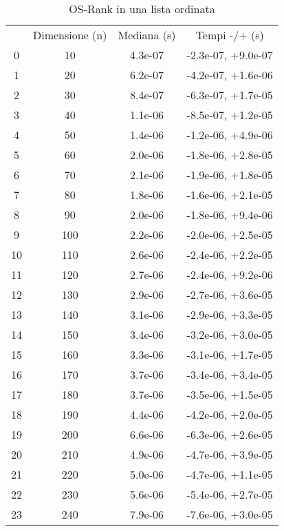 \begin{table}
\centering
\caption{OS-Rank in una lista ordinata}
\label{OS-Rank in una lista ordinata}
\begin{adjustbox}{width=1\textwidth/2}
\begin{tabular}{|c|c|c|c|}
\hline
 & Dimensione (n) & Mediana (s) & Tempi -/+ (s) \\
0 & 10 & 4.3e-07 & -2.3e-07, +9.0e-07 \\
\cline{1-4}
1 & 20 & 6.2e-07 & -4.2e-07, +1.6e-06 \\
\cline{1-4}
2 & 30 & 8.4e-07 & -6.3e-07, +1.7e-05 \\
\cline{1-4}
3 & 40 & 1.1e-06 & -8.5e-07, +1.2e-05 \\
\cline{1-4}
4 & 50 & 1.4e-06 & -1.2e-06, +4.9e-06 \\
\cline{1-4}
5 & 60 & 2.0e-06 & -1.8e-06, +2.8e-05 \\
\cline{1-4}
6 & 70 & 2.1e-06 & -1.9e-06, +1.8e-05 \\
\cline{1-4}
7 & 80 & 1.8e-06 & -1.6e-06, +2.1e-05 \\
\cline{1-4}
8 & 90 & 2.0e-06 & -1.8e-06, +9.4e-06 \\
\cline{1-4}
9 & 100 & 2.2e-06 & -2.0e-06, +2.5e-05 \\
\cline{1-4}
10 & 110 & 2.6e-06 & -2.4e-06, +2.2e-05 \\
\cline{1-4}
11 & 120 & 2.7e-06 & -2.4e-06, +9.2e-06 \\
\cline{1-4}
12 & 130 & 2.9e-06 & -2.7e-06, +3.6e-05 \\
\cline{1-4}
13 & 140 & 3.1e-06 & -2.9e-06, +3.3e-05 \\
\cline{1-4}
14 & 150 & 3.4e-06 & -3.2e-06, +3.0e-05 \\
\cline{1-4}
15 & 160 & 3.3e-06 & -3.1e-06, +1.7e-05 \\
\cline{1-4}
16 & 170 & 3.7e-06 & -3.4e-06, +3.4e-05 \\
\cline{1-4}
17 & 180 & 3.7e-06 & -3.5e-06, +1.5e-05 \\
\cline{1-4}
18 & 190 & 4.4e-06 & -4.2e-06, +2.0e-05 \\
\cline{1-4}
19 & 200 & 6.6e-06 & -6.3e-06, +2.6e-05 \\
\cline{1-4}
20 & 210 & 4.9e-06 & -4.7e-06, +3.9e-05 \\
\cline{1-4}
21 & 220 & 5.0e-06 & -4.7e-06, +1.1e-05 \\
\cline{1-4}
22 & 230 & 5.6e-06 & -5.4e-06, +2.7e-05 \\
\cline{1-4}
23 & 240 & 7.9e-06 & -7.6e-06, +3.0e-05 \\

\end{tabular}
\end{adjustbox}
\end{table}
